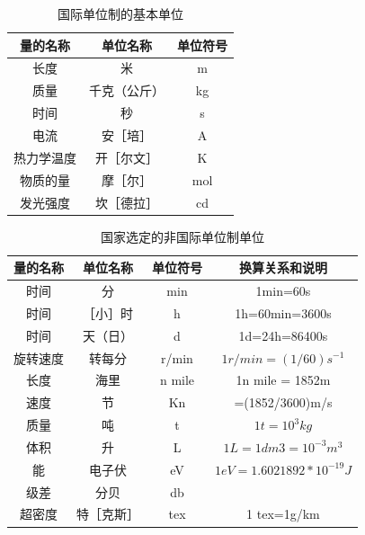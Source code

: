 \begin{table}
	\centering
	\song\wuhao
	\caption{国际单位制的基本单位}
	\begin{tabular}{ccc}
	\hline
	量的名称&单位名称&单位符号\\
	\hline
	长度&米&m\\
	质量&千克（公斤）&kg\\
	时间&秒&s\\
	电流&安［培］&A\\
	热力学温度&开［尔文］&K\\
	物质的量&摩［尔］&mol\\
	发光强度&坎［德拉］&cd\\
	\hline
	\end{tabular}
\end{table}

\begin{table}
	\centering
	\song\wuhao
	\caption{国家选定的非国际单位制单位}
	\begin{tabular}{cccc}
	\hline
	量的名称&单位名称&单位符号&换算关系和说明\\
	\hline
	时间&分&min&1min=60s\\
	时间&［小］时&h&1h=60min=3600s\\
	时间&天（日）&d&1d=24h=86400s\\
	旋转速度&转每分&r/min&$1r/min=(1/60)s^{-1}$\\
	长度&海里&n mile&1n mile = 1852m\\
	速度&节&Kn&=(1852/3600)m/s\\
	质量&吨&t&$1t=10^3kg$\\
	体积&升&L&$1L=1dm3=10^{-3}m^3$\\
	能&电子伏&eV&$1eV=1.6021892*10^{-19}J$\\
	级差&分贝&db&~\\
	超密度&特［克斯］&tex&1 tex=1g/km\\
	\hline
	\end{tabular}
\end{table}

